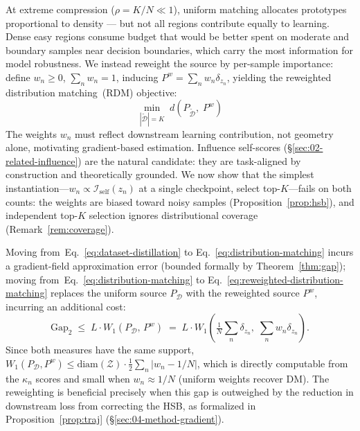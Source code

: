 \begin{foldable} %
  At extreme compression ($\rho = K/N \ll 1$), uniform matching allocates prototypes proportional to density --- but not all regions contribute equally to learning.
  Dense easy regions consume budget that would be better spent on moderate and boundary samples near decision boundaries, which carry the most information for model robustness.
  We instead reweight the source by per-sample importance: define $w_n \geq 0$, $\sum_n w_n = 1$, inducing $P^w = \sum_n w_n \delta_{z_n}$, yielding the reweighted distribution matching~(RDM) objective:
  \begin{equation}
    \min_{|\tilde{\mathcal{D}}| = K}\; d\!\left(P_{\tilde{\mathcal{D}}},\; P^w\right)
    \label{eq:reweighted-distribution-matching}
  \end{equation}
  The weights $w_n$ must reflect downstream learning contribution, not geometry alone, motivating gradient-based estimation.
  Influence self-scores (\S\ref{sec:02-related-influence}) are the natural candidate: they are task-aligned by construction and theoretically grounded.
  We now show that the simplest instantiation---$w_n \propto \mathcal{I}_\text{self}(z_n)$ at a single checkpoint, select top-$K$---fails on both counts: the weights are biased toward noisy samples (Proposition~\ref{prop:hsb}), and independent top-$K$ selection ignores distributional coverage (Remark~\ref{rem:coverage}).
  \begin{remark} \label{rem:double-gap}
    Moving from~Eq.~\ref{eq:dataset-distillation} to Eq.~\ref{eq:distribution-matching} incurs a gradient-field approximation error (bounded formally by Theorem~\ref{thm:gap}); moving from~Eq.~\ref{eq:distribution-matching} to Eq.~\ref{eq:reweighted-distribution-matching} replaces the uniform source $P_\mathcal{D}$ with the reweighted source $P^w$, incurring an additional cost:
    \begin{equation}
      \mathrm{Gap}_2 \;\leq\; L \cdot W_1(P_\mathcal{D},\, P^w) \;=\; L \cdot W_1\!\left(\tfrac{1}{N}\textstyle\sum_n \delta_{z_n},\; \textstyle\sum_n w_n \delta_{z_n}\right).
      \label{eq:gap2}
    \end{equation}
    Since both measures have the same support, $W_1(P_\mathcal{D}, P^w) \leq \mathrm{diam}(\mathcal{Z}) \cdot \frac{1}{2}\sum_n |w_n - 1/N|$, which is directly computable from the $\kappa_n$ scores and small when $w_n \approx 1/N$ (uniform weights recover DM).
    The reweighting is beneficial precisely when this gap is outweighed by the reduction in downstream loss from correcting the HSB, as formalized in Proposition~\ref{prop:traj} (\S\ref{sec:04-method-gradient}).
  \end{remark}
\end{foldable}

